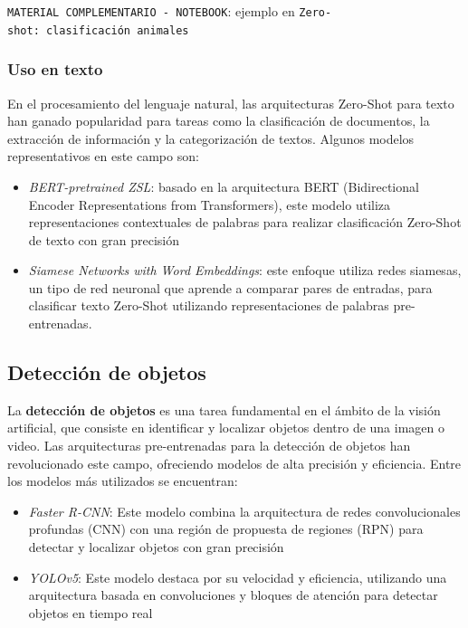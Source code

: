 \documentclass[
  a4paper,
  DIV=11,
  numbers=noendperiod]{scrreprt}
\providecommand{\tightlist}{%
  \setlength{\itemsep}{0pt}\setlength{\parskip}{0pt}}\usepackage{longtable,booktabs,array}
\begin{document}
\texttt{MATERIAL\ COMPLEMENTARIO\ -\ NOTEBOOK}: ejemplo en
\texttt{Zero-shot:\ clasificación\ animales}

\subsubsection{Uso en texto}\label{uso-en-texto}

En el procesamiento del lenguaje natural, las arquitecturas Zero-Shot
para texto han ganado popularidad para tareas como la clasificación de
documentos, la extracción de información y la categorización de textos.
Algunos modelos representativos en este campo son:

\begin{itemize}
\tightlist
\item
  \emph{BERT-pretrained ZSL}: basado en la arquitectura BERT
  (Bidirectional Encoder Representations from Transformers), este modelo
  utiliza representaciones contextuales de palabras para realizar
  clasificación Zero-Shot de texto con gran precisión
\item
  \emph{Siamese Networks with Word Embeddings}: este enfoque utiliza
  redes siamesas, un tipo de red neuronal que aprende a comparar pares
  de entradas, para clasificar texto Zero-Shot utilizando
  representaciones de palabras pre-entrenadas.
\end{itemize}

\subsection{Detección de objetos}\label{detecciuxf3n-de-objetos}

La \textbf{detección de objetos} es una tarea fundamental en el ámbito
de la visión artificial, que consiste en identificar y localizar objetos
dentro de una imagen o video. Las arquitecturas pre-entrenadas para la
detección de objetos han revolucionado este campo, ofreciendo modelos de
alta precisión y eficiencia. Entre los modelos más utilizados se
encuentran:

\begin{itemize}
\tightlist
\item
  \emph{Faster R-CNN}: Este modelo combina la arquitectura de redes
  convolucionales profundas (CNN) con una región de propuesta de
  regiones (RPN) para detectar y localizar objetos con gran precisión
\item
  \emph{YOLOv5}: Este modelo destaca por su velocidad y eficiencia,
  utilizando una arquitectura basada en convoluciones y bloques de
  atención para detectar objetos en tiempo real
\end{itemize}
\end{document}

